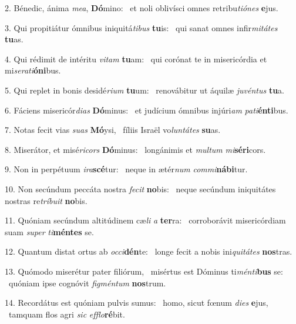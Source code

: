 2. Bénedic, ánima \textit{me}\textit{a}, \textbf{Dó}mino: \ast\  et noli oblivísci omnes retribu\textit{ti}\textit{ó}\textit{nes} \textbf{e}jus.\

3. Qui propitiátur ómnibus iniquitá\textit{ti}\textit{bus} \textbf{tu}is: \ast\  qui sanat omnes infir\textit{mi}\textit{tá}\textit{tes} \textbf{tu}as.\

4. Qui rédimit de intéritu \textit{vi}\textit{tam} \textbf{tu}am: \ast\  qui corónat te in misericórdia et mi\textit{se}\textit{ra}\textit{ti}\textbf{ó}\textbf{ni}bus.\

5. Qui replet in bonis desidé\textit{ri}\textit{um} \textbf{tu}um: \ast\  renovábitur ut áquilæ \textit{ju}\textit{vén}\textit{tus} \textbf{tu}a.\

6. Fáciens misericór\textit{di}\textit{as} \textbf{Dó}minus: \ast\  et judícium ómnibus injúri\textit{am} \textit{pa}\textit{ti}\textbf{én}\textbf{ti}bus.\

7. Notas fecit vias \textit{su}\textit{as} \textbf{Mó}ysi, \ast\  fíliis Israël vo\textit{lun}\textit{tá}\textit{tes} \textbf{su}as.\

8. Miserátor, et misé\textit{ri}\textit{cors} \textbf{Dó}minus: \ast\  longánimis et \textit{mul}\textit{tum} \textit{mi}\textbf{sé}\textbf{ri}cors.\

9. Non in perpétuum \textit{i}\textit{ra}\textbf{scé}tur: \ast\  neque in ætér\textit{num} \textit{com}\textit{mi}\textbf{ná}\textbf{bi}tur.\

10. Non secúndum peccáta nostra \textit{fe}\textit{cit} \textbf{no}bis: \ast\  neque secúndum iniquitátes nostras re\textit{trí}\textit{bu}\textit{it} \textbf{no}bis.\

11. Quóniam secúndum altitúdinem cæ\textit{li} \textit{a} \textbf{ter}ra: \ast\  corroborávit misericórdiam suam \textit{su}\textit{per} \textit{ti}\textbf{mén}\textbf{tes} se.\

12. Quantum distat ortus ab \textit{oc}\textit{ci}\textbf{dén}te: \ast\  longe fecit a nobis ini\textit{qui}\textit{tá}\textit{tes} \textbf{nos}tras.\

13. Quómodo miserétur pater filiórum, \dag\  misértus est Dóminus ti\textit{mén}\textit{ti}\textbf{bus} se: \ast\  quóniam ipse cognóvit \textit{fig}\textit{mén}\textit{tum} \textbf{nos}trum.\

14. Recordátus est quóniam pulvis sumus: \dag\  homo, sicut fœnum \textit{di}\textit{es} \textbf{e}jus, \ast\  tamquam flos agri \textit{sic} \textit{ef}\textit{flo}\textbf{ré}bit.\

